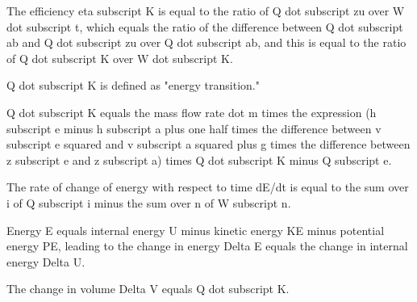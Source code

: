 The efficiency eta subscript K is equal to the ratio of Q dot subscript zu over W dot subscript t, which equals the ratio of the difference between Q dot subscript ab and Q dot subscript zu over Q dot subscript ab, and this is equal to the ratio of Q dot subscript K over W dot subscript K.

Q dot subscript K is defined as "energy transition."

Q dot subscript K equals the mass flow rate dot m times the expression (h subscript e minus h subscript a plus one half times the difference between v subscript e squared and v subscript a squared plus g times the difference between z subscript e and z subscript a) times Q dot subscript K minus Q subscript e.

The rate of change of energy with respect to time dE/dt is equal to the sum over i of Q subscript i minus the sum over n of W subscript n.

Energy E equals internal energy U minus kinetic energy KE minus potential energy PE, leading to the change in energy Delta E equals the change in internal energy Delta U.

The change in volume Delta V equals Q dot subscript K.